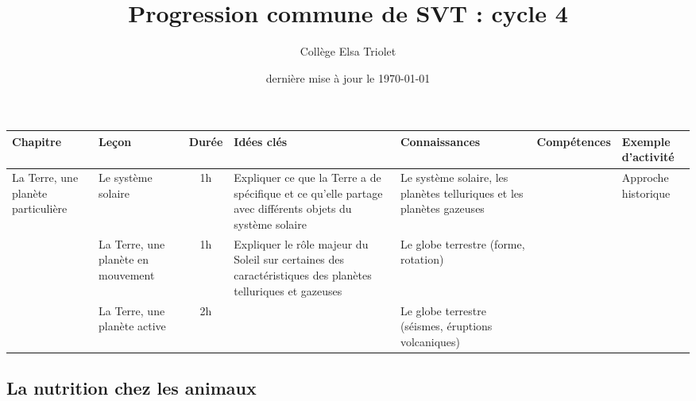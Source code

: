 \documentclass{Progression}
\title{Progression commune de SVT : cycle 4}
\author{Collège Elsa Triolet}
\date{dernière mise à jour le \today}
\begin{document}
\maketitle

{}
{}
{}

\noindent
\begin{tabularx}{\linewidth}{p{3cm}p{3cm}cp{6cm}*3{X}}
  \toprule
  \textbf{Chapitre} & \textbf{Leçon} & \textbf{Durée} & \textbf{Idées clés} & \textbf{Connaissances} & \textbf{Compétences} & \textbf{Exemple d'activité} \\
  \midrule
  La Terre, une planète particulière & Le système solaire & 1h & Expliquer ce que la Terre a de spécifique et ce qu’elle partage avec différents objets du système solaire & Le système solaire, les planètes telluriques et les planètes gazeuses & & Approche historique \\
  \cmidrule(l){2-7}
                    & La Terre, une planète en mouvement & 1h & Expliquer le rôle majeur du Soleil sur certaines des caractéristiques des planètes telluriques et gazeuses & Le globe terrestre (forme, rotation) & & \\
  \cmidrule(l){2-7}
                    & La Terre, une planète active & 2h & & Le globe terrestre (séismes, éruptions volcaniques) & & \\
  \midrule
\end{tabularx}

\clearpage

{}
\subsection*{La nutrition chez les animaux}
{}
\end{document}
